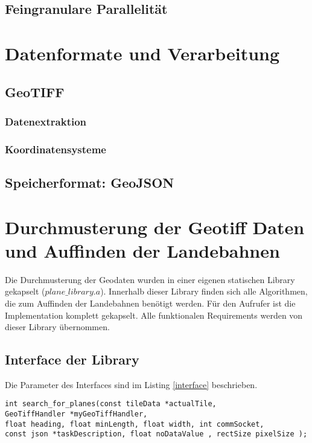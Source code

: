 \documentclass[10pt,a4paper]{report}
\begin{document}
\section{Feingranulare Parallelität}

\chapter{Datenformate und Verarbeitung}
\section{GeoTIFF}
\subsection{Datenextraktion}
\subsection{Koordinatensysteme}
\section{Speicherformat: GeoJSON}

\chapter{Durchmusterung der Geotiff Daten und Auffinden der Landebahnen}
Die Durchmusterung der Geodaten wurden in einer eigenen statischen Library gekapselt ($plane\_library.a$). Innerhalb dieser Library finden sich alle Algorithmen, die zum Auffinden der Landebahnen benötigt werden. Für den Aufrufer ist die Implementation komplett gekapselt. Alle funktionalen Requirements werden von dieser Library übernommen.


\section{Interface der Library}

Die Parameter des Interfaces sind im Listing \ref{interface} beschrieben.

\begin{lstlisting}[caption=Interface Beschreibung, label=interface]
int search_for_planes(const tileData *actualTile, 
GeoTiffHandler *myGeoTiffHandler, 
float heading, float minLength, float width, int commSocket,
const json *taskDescription, float noDataValue , rectSize pixelSize );
\end{lstlisting}
\end{document}
